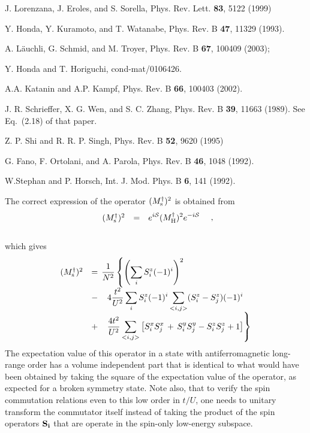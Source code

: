 \documentclass[aps,prb,twocolumn,superscriptaddress,
               amsmath]{revtex4}
\newcommand{\eqn}[1]{\vspace{-0.cm}\begin{equation}
#1
\end{equation}}
\renewcommand{\=}{\,=\,}
\newcommand{\+}{\,+\,}
\renewcommand{\-}{\,-\,}
\newcommand{\f}[2]{{\ensuremath{\mathchoice%
        {\dfrac{#1}{#2}}
        {\dfrac{#1}{#2}}
        {\frac{#1}{#2}}
        {\frac{#1}{#2}}
        }}}
\begin{document}
\begin{thebibliography}{99}
J. Lorenzana, J. Eroles,  and S. Sorella, Phys. Rev. Lett. {\bf 83}, 5122 (1999)



Y. Honda, Y. Kuramoto, and T. Watanabe, Phys. Rev. B {\bf 47}, 11329 (1993).


A. L\"auchli, G. Schmid, and M. Troyer,   Phys. Rev. B {\bf 67},  100409 (2003);


Y. Honda and T. Horiguchi, cond-mat/0106426.


A.A. Katanin and A.P. Kampf, Phys. Rev. B {\bf 66},  100403 (2002).


J. R. Schrieffer, X. G. Wen, and
S. C. Zhang, Phys. Rev. B {\bf 39}, 11663 (1989). See Eq.~(2.18) of that
paper.

Z. P. Shi and R. R. P. Singh, Phys. Rev. B {\bf 52}, 9620 (1995)

G. Fano, F. Ortolani, and A. Parola,  Phys. Rev. B {\bf 46}, 1048 (1992).



W.Stephan and P. Horsch, Int. J. Mod. Phys. B {\bf 6}, 141 (1992).


The correct expression of the operator $(M_{\rm s}^{\dag})^2$ is
obtained from
\\
\vspace*{-0.3cm}
\eqn{\begin{array}{ccl}
(M_{\rm s}^{\dag})^2 &=& \displaystyle
e^{i{\cal S}} (M_{\rm H}^\dagger)^2  e^{-i{\cal S}}
\end{array}\nonumber
\;\;\; , }
\\
which gives
\\
\vspace*{-0.3cm}
{\footnotesize\eqn{\begin{array}{ccl}
(M_{\rm s}^{\dag})^2&=& \hspace*{-0.2cm}
\displaystyle\f{1}{N^2}\left\{\left(\sum_i S_i^z(-1)^i\right)^2\right.\\&-&\displaystyle\left.
4\frac{t^2}{U^2}\sum_i S_i^z(-1)^i \sum_{<i,j>} (S_i^z - S_j^z)(-1)^i\right. \\ &+&\displaystyle \left. \f{4t^2}{U^2} \sum_{<i,j>}\left[S_i^x S_j^x \+
S_i^y S_j^y -S_i^z S_j^z +1\right]\right\}
\end{array}\nonumber}
}
The expectation value of this operator in a state with antiferromagnetic long-range
order has a volume independent part that is identical to what would have been
obtained by taking the square of the expectation value of the operator, as
expected for a broken symmetry state. 
Note also, that to verify the spin commutation relations even to
this low order in $t/U$, 
one needs to unitary transform the commutator itself instead of taking 
the product of the spin operators ${\bf S_i}$
that are operate in the spin-only low-energy subspace.



\end{thebibliography}
\end{document}
